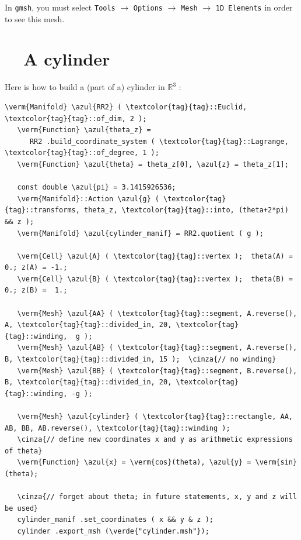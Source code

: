 In {\tt gmsh}, you must select {\small\tt Tools} $\to$ {\small\tt Options} $\to$
{\small\tt Mesh} $\to$ {\small\tt 1D Elements} in order to see this mesh.


\section{~~A cylinder}\label{\numb section 7.\numb parag 3}

Here is how to build a (part of a) cylinder in $ \mathbb{R}^3 $ :

\begin{Verbatim}[commandchars=\\\{\},formatcom=\small\tt,frame=single,
   label=parag-\ref{\numb section 7.\numb parag 3}.cpp,rulecolor=\color{coment},
   baselinestretch=0.94,framesep=2mm                                            ]
   \verm{Manifold} \azul{RR2} ( \textcolor{tag}{tag}::Euclid, \textcolor{tag}{tag}::of_dim, 2 );
   \verm{Function} \azul{theta_z} =
      RR2 .build_coordinate_system ( \textcolor{tag}{tag}::Lagrange, \textcolor{tag}{tag}::of_degree, 1 );
   \verm{Function} \azul{theta} = theta_z[0], \azul{z} = theta_z[1];

   const double \azul{pi} = 3.1415926536;
   \verm{Manifold}::Action \azul{g} ( \textcolor{tag}{tag}::transforms, theta_z, \textcolor{tag}{tag}::into, (theta+2*pi) && z );
   \verm{Manifold} \azul{cylinder_manif} = RR2.quotient ( g );

   \verm{Cell} \azul{A} ( \textcolor{tag}{tag}::vertex );  theta(A) = 0.; z(A) = -1.;
   \verm{Cell} \azul{B} ( \textcolor{tag}{tag}::vertex );  theta(B) = 0.; z(B) =  1.;

   \verm{Mesh} \azul{AA} ( \textcolor{tag}{tag}::segment, A.reverse(), A, \textcolor{tag}{tag}::divided_in, 20, \textcolor{tag}{tag}::winding,  g );
   \verm{Mesh} \azul{AB} ( \textcolor{tag}{tag}::segment, A.reverse(), B, \textcolor{tag}{tag}::divided_in, 15 );  \cinza{// no winding}
   \verm{Mesh} \azul{BB} ( \textcolor{tag}{tag}::segment, B.reverse(), B, \textcolor{tag}{tag}::divided_in, 20, \textcolor{tag}{tag}::winding, -g );

   \verm{Mesh} \azul{cylinder} ( \textcolor{tag}{tag}::rectangle, AA, AB, BB, AB.reverse(), \textcolor{tag}{tag}::winding );
   \cinza{// define new coordinates x and y as arithmetic expressions of theta}
   \verm{Function} \azul{x} = \verm{cos}(theta), \azul{y} = \verm{sin}(theta);

   \cinza{// forget about theta; in future statements, x, y and z will be used}
   cylinder_manif .set_coordinates ( x && y & z );
   cylinder .export_msh (\verde{"cylinder.msh"});
\end{Verbatim}

